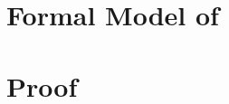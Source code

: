 \appendix

\section{Formal Model of \usso}
\label{appendix-model}



\section{Proof}
\label{appendix-security}